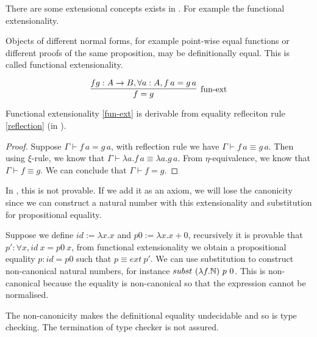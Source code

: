There are some extensional concepts exists in \ett. For example the functional extensionality.

\begin{definition}\label{fun-ext}
Objects of different normal forms, for example point-wise equal functions or different proofs of the same proposition, may be definitionally equal. This is called functional extensionality.

\begin{equation}
\infer[\text{fun-ext}]{f = g}{f g : A \rightarrow B, \forall a : A, f \, a = g \, a}
\end{equation}

\end{definition}



\begin{lemma}
\label{functional extensionality is available in ett}
Functional extensionality \ref{fun-ext} is derivable from equality refleciton rule \ref{reflection} (in \ett).
\end{lemma}
 
\begin{proof}
Suppose $\Gamma \vdash f \,a = g \,a$, with reflection rule we have $\Gamma \vdash f \,a \equiv g \,a$.
Then using $\xi$-rule, we know that $\Gamma \vdash \lambda a . f \,a \equiv \lambda a . g \,a$.
From $\eta$-equivalence, we know that $\Gamma \vdash f \equiv g$. We can conclude that $\Gamma \vdash f = g$.
\end{proof}

In \itt, this is not provable. If we add it as an axiom, we will lose the canonicity since we can construct a natural number with this extensionality and substitution for propositional equality.

\begin{example}
Suppose we define $id := \lambda x . x$ and $p0 := \lambda x . x + 0$, recursively it is provable that $p': \forall x , id~ x = p0~x$, from functional extensionality we obtain a propositional equality $p: id = p0$ such that $p \equiv ext ~p'$. We can use substitution to construct non-canonical natural numbers, for instance $subst~ (\lambda f. \mathbb{N}) ~p ~0$. This is non-canonical because the equality is non-canonical so that the expression cannot be normalised.
\end{example}


The non-canonicity makes the definitional equality undecidable and so is type checking. The termination of type checker is not assured.



